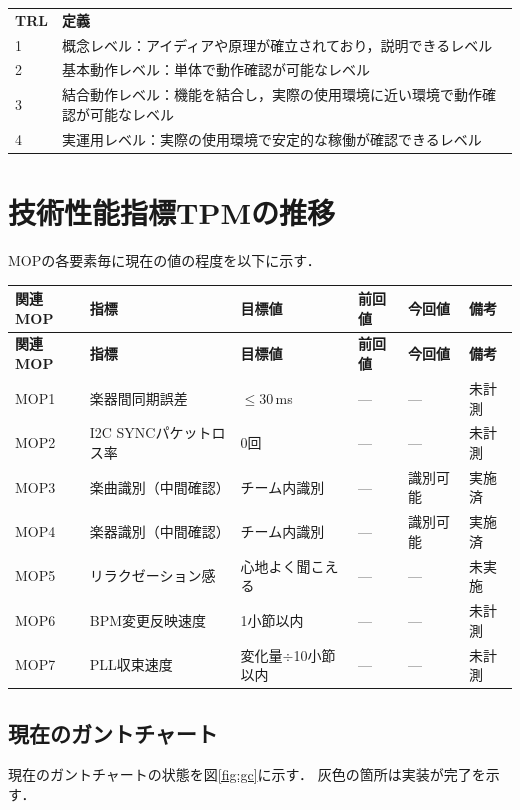 \documentclass[a4paper,12pt]{ltjsarticle}
\begin{document}
\noindent
{\small
\begin{tabular}{ll}
  \textbf{TRL} & \textbf{定義} \\
  1 & 概念レベル：アイディアや原理が確立されており，説明できるレベル \\
  2 & 基本動作レベル：単体で動作確認が可能なレベル \\
  3 & 結合動作レベル：機能を結合し，実際の使用環境に近い環境で動作確認が可能なレベル \\
  4 & 実運用レベル：実際の使用環境で安定的な稼働が確認できるレベル \\
\end{tabular}
}

\section{技術性能指標TPMの推移} 
MOPの各要素毎に現在の値の程度を以下に示す．

\begin{longtable}{L{2cm}L{3cm}C{2cm}C{2cm}C{2cm}L{2.5cm}}
  \toprule
  \textbf{関連MOP} & \textbf{指標} & \textbf{目標値} & \textbf{前回値} & \textbf{今回値} & \textbf{備考} \\
  \midrule
  \endfirsthead
  \toprule
  \textbf{関連MOP} & \textbf{指標} & \textbf{目標値} & \textbf{前回値} & \textbf{今回値} & \textbf{備考} \\
  \midrule
  \endhead
  \midrule
  \endfoot
  \bottomrule
  \endlastfoot
  MOP1 & 楽器間同期誤差 & $\leq 30$\,ms & --- & --- & 未計測 \\
  MOP2 & I2C SYNCパケットロス率 & 0回 & --- & --- & 未計測 \\
  MOP3 & 楽曲識別（中間確認） & チーム内識別 & --- & 識別可能 & 実施済 \\
  MOP4 & 楽器識別（中間確認） & チーム内識別 & --- & 識別可能 & 実施済 \\
  MOP5 & リラクゼーション感 & 心地よく聞こえる & --- & --- & 未実施 \\
  MOP6 & BPM変更反映速度 & 1小節以内 & --- & --- & 未計測 \\
  MOP7 & PLL収束速度 & 変化量$\div$10小節以内 & --- & --- & 未計測 \\
\end{longtable}

\subsection{現在のガントチャート}
現在のガントチャートの状態を図\ref{fig:gc}に示す．
灰色の箇所は実装が完了を示す．
\end{document}
